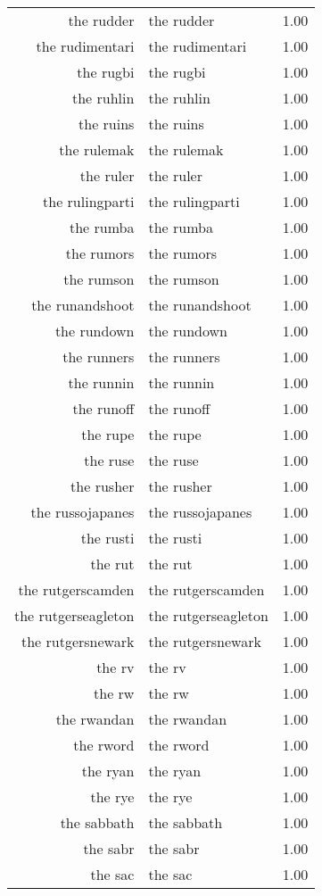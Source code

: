 \begin{table}[ht]
\begin{tabular}{rlr}
  the rudder & the rudder & 1.00 \\ 
  the rudimentari & the rudimentari & 1.00 \\ 
  the rugbi & the rugbi & 1.00 \\ 
  the ruhlin & the ruhlin & 1.00 \\ 
  the ruins & the ruins & 1.00 \\ 
  the rulemak & the rulemak & 1.00 \\ 
  the ruler & the ruler & 1.00 \\ 
  the rulingparti & the rulingparti & 1.00 \\ 
  the rumba & the rumba & 1.00 \\ 
  the rumors & the rumors & 1.00 \\ 
  the rumson & the rumson & 1.00 \\ 
  the runandshoot & the runandshoot & 1.00 \\ 
  the rundown & the rundown & 1.00 \\ 
  the runners & the runners & 1.00 \\ 
  the runnin & the runnin & 1.00 \\ 
  the runoff & the runoff & 1.00 \\ 
  the rupe & the rupe & 1.00 \\ 
  the ruse & the ruse & 1.00 \\ 
  the rusher & the rusher & 1.00 \\ 
  the russojapanes & the russojapanes & 1.00 \\ 
  the rusti & the rusti & 1.00 \\ 
  the rut & the rut & 1.00 \\ 
  the rutgerscamden & the rutgerscamden & 1.00 \\ 
  the rutgerseagleton & the rutgerseagleton & 1.00 \\ 
  the rutgersnewark & the rutgersnewark & 1.00 \\ 
  the rv & the rv & 1.00 \\ 
  the rw & the rw & 1.00 \\ 
  the rwandan & the rwandan & 1.00 \\ 
  the rword & the rword & 1.00 \\ 
  the ryan & the ryan & 1.00 \\ 
  the rye & the rye & 1.00 \\ 
  the sabbath & the sabbath & 1.00 \\ 
  the sabr & the sabr & 1.00 \\ 
  the sac & the sac & 1.00 \\ 

\end{tabular}
\end{table}
